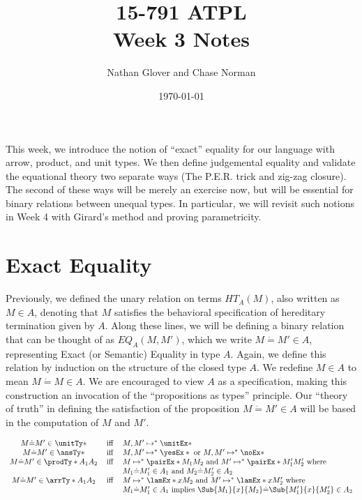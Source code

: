 \documentclass[letterpaper]{article}
\title{15-791 ATPL \\ Week 3 Notes}
\author{Nathan Glover and Chase Norman}
\date{\today}
\begin{document}
\maketitle

This week, we introduce the notion of ``exact'' equality for our language with arrow, product, and unit types. 
We then define judgemental equality and validate the equational theory two separate ways (The P.E.R. trick and zig-zag closure).
The second of these ways will be merely an exercise now, but will be essential for binary relations between unequal types. 
In particular, we will revisit such notions in Week 4 with Girard's method and proving parametricity. 

\section{Exact Equality}

Previously, we defined the unary relation on terms $HT_A(M)$, also written as $M \in A$, denoting that $M$ satisfies the behavioral specification of hereditary termination given by $A$.
Along these lines, we will be defining a binary relation that can be thought of as $EQ_A(M, M')$, which we write $M \dot{=} M' \in A$, representing Exact (or Semantic) Equality in type $A$.
Again, we define this relation by induction on the structure of the closed type $A$. We redefine $M \in A$ to mean $M \dot{=} M \in A$. 
We are encouraged to view $A$ as a specification, making this construction an invocation of the ``propositions as types'' principle. 
Our ``theory of truth'' in defining the satisfaction of the proposition $M \dot{=} M' \in A$ will be based in the computation of $M$ and $M'$. 

\begin{definition}
    $$
  \begin{array}{cll}
      M \dot{=} M' \in \unitTy* & \Iff & M, M' \mapsto^* \unitEx* \\
      M \dot{=} M' \in \ansTy* & \Iff & M, M' \mapsto^* \yesEx* \text{ or } M, M' \mapsto^* \noEx* \\
      M \dot{=} M' \in \prodTy*{A_1}{A_2} & \Iff &
         M \mapsto^* \pairEx*{M_1}{M_2} \text{ and } M' \mapsto^* \pairEx*{M_1'}{M_2'} \text{ where } \\ & & M_1 \dot{=} M_1' \in A_1 \text{ and } M_2 \dot{=} M_2' \in A_2 \\
      M \dot{=} M' \in \arrTy*{A_1}{A_2} & \Iff & M \mapsto^* \lamEx*{x}{M_2} \text{ and } M' \mapsto^* \lamEx*{x}{M_2'} \text{ where }\\ & & 
      M_1 \dot{=} M_1' \in A_1 \text{ implies } \Sub{M_1}{x}{M_2} \dot{=} \Sub{M_1'}{x}{M_2'} \in A_2 \\
  \end{array}
  $$
\end{definition}
\end{document}
